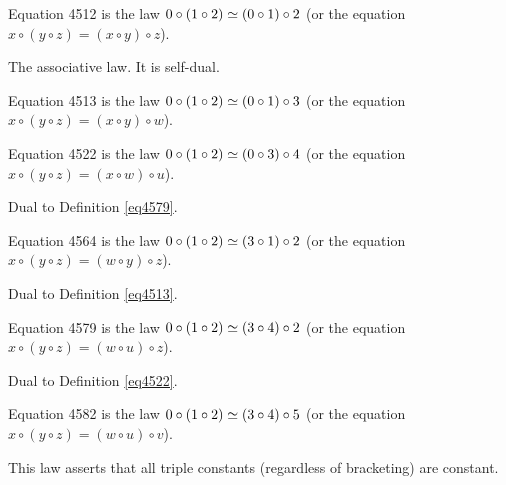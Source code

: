 \begin{definition}[Equation 953]
\begin{definition}[Equation 4512]\label{eq4512}\leanok{}  Equation 4512 is the law $0 \circ (1 \circ 2)  \simeq  (0 \circ 1) \circ 2$ (or the equation $x \circ (y \circ z) = (x \circ y) \circ z$).
\end{definition}

The associative law. It is self-dual.

\begin{definition}[Equation 4513]\label{eq4513}\leanok{}  Equation 4513 is the law $0 \circ (1 \circ 2)  \simeq  (0 \circ 1) \circ 3$ (or the equation $x \circ (y \circ z) = (x \circ y) \circ w$).
\end{definition}

\begin{definition}[Equation 4522]\label{eq4522}\leanok{}  Equation 4522 is the law $0 \circ (1 \circ 2)  \simeq  (0 \circ 3) \circ 4$ (or the equation $x \circ (y \circ z) = (x \circ w) \circ u$).
\end{definition}

Dual to Definition \ref{eq4579}.

\begin{definition}[Equation 4564]\label{eq4564}\leanok{}  Equation 4564 is the law $0 \circ (1 \circ 2)  \simeq  (3 \circ 1) \circ 2$ (or the equation $x \circ (y \circ z) = (w \circ y) \circ z$).
\end{definition}

Dual to Definition \ref{eq4513}.

\begin{definition}[Equation 4579]\label{eq4579}\leanok{}  Equation 4579 is the law $0 \circ (1 \circ 2)  \simeq  (3 \circ 4) \circ 2$ (or the equation $x \circ (y \circ z) = (w \circ u) \circ z$).
\end{definition}

Dual to Definition \ref{eq4522}.

\begin{definition}[Equation 4582]\label{eq4582}\leanok{}  Equation 4582 is the law $0 \circ (1 \circ 2)  \simeq  (3 \circ 4) \circ 5$ (or the equation $x \circ (y \circ z) = (w \circ u) \circ v$).
\end{definition}

This law asserts that all triple constants (regardless of bracketing) are constant.


\end{definition}

